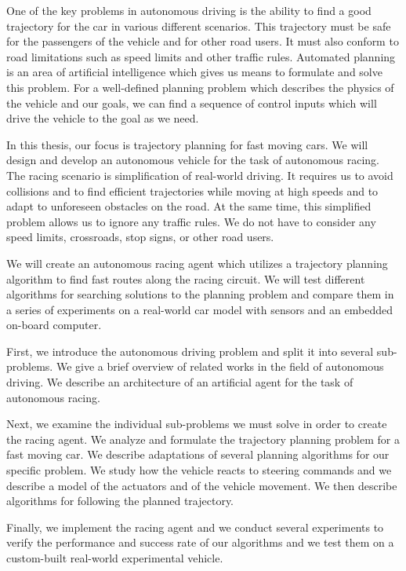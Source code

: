One of the key problems in autonomous driving is the ability to find a good trajectory for the car in various different scenarios. This trajectory must be safe for the passengers of the vehicle and for other road users. It must also conform to road limitations such as speed limits and other traffic rules. Automated planning is an area of artificial intelligence which gives us means to formulate and solve this problem. For a well-defined planning problem which describes the physics of the vehicle and our goals, we can find a sequence of control inputs which will drive the vehicle to the goal as we need.

In this thesis, our focus is trajectory planning for fast moving cars. We will design and develop an autonomous vehicle for the task of autonomous racing. The racing scenario is simplification of real-world driving. It requires us to avoid collisions and to find efficient trajectories while moving at high speeds and to adapt to unforeseen obstacles on the road. At the same time, this simplified problem allows us to ignore any traffic rules. We do not have to consider any speed limits, crossroads, stop signs, or other road users.

We will create an autonomous racing agent which utilizes a trajectory planning algorithm to find fast routes along the racing circuit. We will test different algorithms for searching solutions to the planning problem and compare them in a series of experiments on a real-world car model with sensors and an embedded on-board computer.

First, we introduce the autonomous driving problem and split it into several sub-problems. We give a brief overview of related works in the field of autonomous driving. We describe an architecture of an artificial agent for the task of autonomous racing.

Next, we examine the individual sub-problems we must solve in order to create the racing agent. We analyze and formulate the trajectory planning problem for a fast moving car. We describe adaptations of several planning algorithms for our specific problem. We study how the vehicle reacts to steering commands and we describe a model of the actuators and of the vehicle movement. We then describe algorithms for following the planned trajectory.

Finally, we implement the racing agent and we conduct several experiments to verify the performance and success rate of our algorithms and we test them on a custom-built real-world experimental vehicle.
